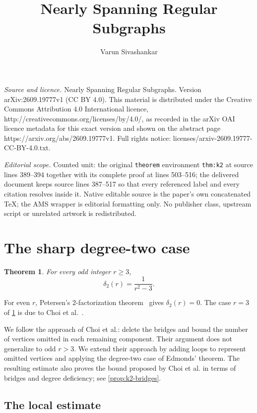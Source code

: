 \documentclass[10pt,a4paper]{amsart}
\newtheorem{theorem}{Theorem}[section]
\begin{document}
\title[Nearly Spanning Regular Subgraphs]{Nearly Spanning Regular Subgraphs}
\author{Varun Sivashankar}
\date{}
\maketitle
\noindent\emph{Source and licence.} Nearly Spanning Regular Subgraphs. Version arXiv:2609.19777v1 (CC BY 4.0). This material is distributed under the Creative Commons Attribution 4.0 International licence, http://creativecommons.org/licenses/by/4.0/, as recorded in the arXiv OAI licence metadata for this exact version and shown on the abstract page https://arxiv.org/abs/2609.19777v1. Full rights notice: licenses/arxiv-2609.19777-CC-BY-4.0.txt.\par\smallskip
\noindent\textit{Editorial scope.} Counted unit: the original \texttt{theorem} environment \texttt{thm:k2} at source lines 389--394 together with its complete proof at lines 503--516; the delivered document keeps source lines 387--517 so that every referenced label and every citation resolves inside it. Native editable source is the paper's own concatenated TeX; the AMS wrapper is editorial formatting only. No publisher class, upstream script or unrelated artwork is redistributed.
\section{The sharp degree-two case}\label{sec:k2}


\begin{theorem}\label{thm:k2}
For every odd integer $r\ge3$,
\[
\delta_2(r)=\frac1{r^2-3}.
\]
\end{theorem}


For even $r$, Petersen's $2$-factorization theorem~\cite{Petersen1891} gives $\delta_2(r)=0$. The case $r=3$ of \cref{thm:k2} is due to Choi et al.~\cite{CKKPW2019}.

We follow the approach of Choi et al.: delete the bridges and bound the number of vertices omitted in each remaining component. Their argument does not generalize to odd $r > 3$. We extend their approach by adding loops to represent omitted vertices and applying the degree-two case of Edmonds' theorem. The resulting estimate also proves the bound proposed by Choi et al. in terms of bridges and degree deficiency; see \cref{prop:k2-bridges}.

\subsection{The local estimate}
\end{document}
